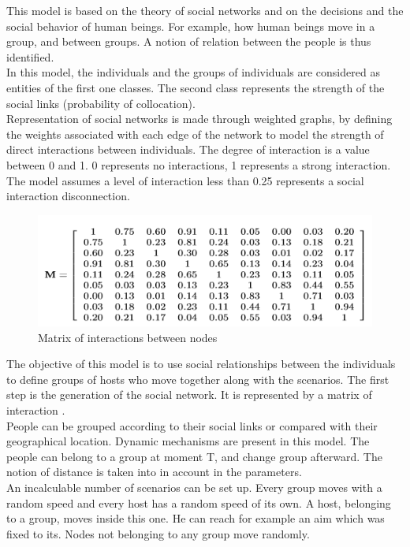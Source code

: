 This model is based on the theory of social networks and on the decisions and the social behavior of human beings. For example, how human beings move in a group, and between groups. A notion of relation between the people is thus identified.\\
In this model, the individuals and the groups of individuals are considered as entities of the first one classes. The second class represents the strength of the social links (probability of collocation).\\

Representation of social networks is made through weighted graphs, by defining the weights associated with each edge of the network to model the strength of direct interactions between individuals. The degree of interaction is a value between 0 and 1. 0 represents no interactions, 1 represents a strong interaction.
The model assumes a level of interaction less than 0.25 represents a social interaction disconnection.\\

\begin{figure}[h]
\center
\includegraphics{../images/MatrixInteractionSocialNetwork.png}
\caption{\label{MatricSN}Matrix of interactions between nodes\cite{networkTheory5}}
\label{MatricSN}
\end{figure}

The objective of this model is to use social relationships between the individuals to define groups of hosts who move together along with the scenarios.
The first step is the generation of the social network. It is represented by a matrix of interaction \pageref{MatricSN}.\\

People can be grouped according to their social links or compared with their geographical location. Dynamic mechanisms are present in this model. The people can belong to a group at moment T, and change group afterward. The notion of distance is taken into in account in the parameters.\\
An incalculable number of scenarios can be set up. Every group moves with a random speed and every host has a random speed of its own. A host, belonging to a group, moves inside this one. He can reach for example an aim which was fixed to its. Nodes not belonging to any group move randomly.\\

